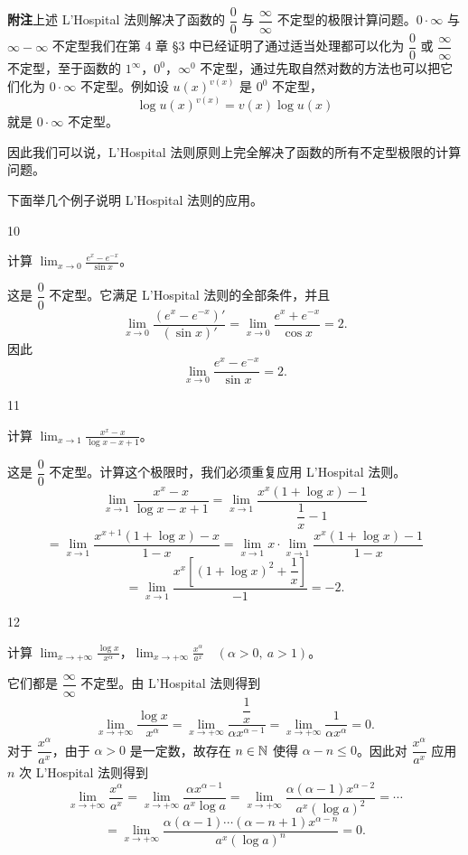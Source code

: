 \textbf{附注}\quad 上述 L'Hospital 法则解决了函数的 \(\dfrac00\) 与 \(\dfrac\infty\infty\) 不定型的极限计算问题。\(0\cdot\infty\) 与 \(\infty-\infty\) 不定型我们在第 4 章 §3 中已经证明了通过适当处理都可以化为 \(\dfrac00\) 或 \(\dfrac\infty\infty\) 不定型，至于函数的 \(1^\infty\)，\(0^0\)，\(\infty^0\) 不定型，通过先取自然对数的方法也可以把它们化为 \(0\cdot\infty\) 不定型。例如设 \(u(x)^{v(x)}\) 是 \(0^0\) 不定型，
\[
\log u(x)^{v(x)}=v(x)\log u(x)
\]
就是 \(0\cdot\infty\) 不定型。

因此我们可以说，L'Hospital 法则原则上完全解决了函数的所有不定型极限的计算问题。

下面举几个例子说明 L'Hospital 法则的应用。

\begin{sourceexample}{10}

	计算 \(\displaystyle\lim_{x\to0}\frac{e^x-e^{-x}}{\sin x}\)。

	这是 \(\dfrac00\) 不定型。它满足 L'Hospital 法则的全部条件，并且
	\[
	\lim_{x\to0}\frac{(e^x-e^{-x})'}{(\sin x)'}=\lim_{x\to0}\frac{e^x+e^{-x}}{\cos x}=2.
	\]
	因此
	\[
	\lim_{x\to0}\frac{e^x-e^{-x}}{\sin x}=2.
	\]

\end{sourceexample}

\begin{sourceexample}{11}

	计算 \(\displaystyle\lim_{x\to1}\frac{x^x-x}{\log x-x+1}\)。

	这是 \(\dfrac00\) 不定型。计算这个极限时，我们必须重复应用 L'Hospital 法则。
	\[
	\lim_{x\to1}\frac{x^x-x}{\log x-x+1}
	=\lim_{x\to1}\frac{x^x(1+\log x)-1}{\dfrac1x-1}
	\]
	\[
	=\lim_{x\to1}\frac{x^{x+1}(1+\log x)-x}{1-x}
	=\lim_{x\to1}x\cdot\lim_{x\to1}\frac{x^x(1+\log x)-1}{1-x}
	\]
	\[
	=\lim_{x\to1}\frac{x^x\left[(1+\log x)^2+\dfrac1x\right]}{-1}=-2.
	\]

\end{sourceexample}

\begin{sourceexample}{12}

	计算 \(\displaystyle\lim_{x\to+\infty}\frac{\log x}{x^\alpha}\)，\(\displaystyle\lim_{x\to+\infty}\frac{x^\alpha}{a^x}\quad(\alpha>0,\ a>1)\)。

	它们都是 \(\dfrac\infty\infty\) 不定型。由 L'Hospital 法则得到
	\[
	\lim_{x\to+\infty}\frac{\log x}{x^\alpha}
	=\lim_{x\to+\infty}\frac{\dfrac1x}{\alpha x^{\alpha-1}}
	=\lim_{x\to+\infty}\frac1{\alpha x^\alpha}=0.
	\]
	对于 \(\dfrac{x^\alpha}{a^x}\)，由于 \(\alpha>0\) 是一定数，故存在 \(n\in\mathbb{N}\) 使得 \(\alpha-n\le0\)。因此对 \(\dfrac{x^\alpha}{a^x}\) 应用 \(n\) 次 L'Hospital 法则得到
	\[
	\lim_{x\to+\infty}\frac{x^\alpha}{a^x}
	=\lim_{x\to+\infty}\frac{\alpha x^{\alpha-1}}{a^x\log a}
	=\lim_{x\to+\infty}\frac{\alpha(\alpha-1)x^{\alpha-2}}{a^x(\log a)^2}
	=\cdots
	\]
	\[
	=\lim_{x\to+\infty}\frac{\alpha(\alpha-1)\cdots(\alpha-n+1)x^{\alpha-n}}{a^x(\log a)^n}=0.
	\]

\end{sourceexample}

